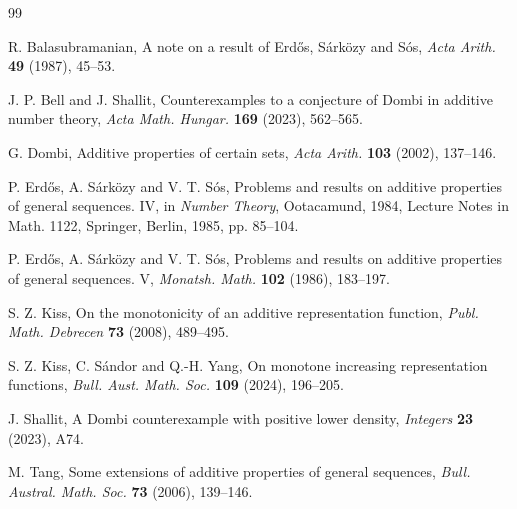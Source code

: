 \documentclass[11pt]{amsart}
\theoremstyle{remark}
\theoremstyle{plain}
\begin{document}
\begin{thebibliography}{99}


R. Balasubramanian, A note on a result of Erd\H{o}s, S\'{a}rk\"{o}zy and S\'{o}s, \emph{Acta Arith.} \textbf{49} (1987), 45--53.

J. P. Bell and J. Shallit, Counterexamples to a conjecture of Dombi in additive number theory, \emph{Acta Math. Hungar.} \textbf{169} (2023), 562--565.

G. Dombi, Additive properties of certain sets, \emph{Acta Arith.} \textbf{103} (2002), 137--146.


P. Erd\H{o}s, A. S\'{a}rk\"{o}zy and V. T. S\'{o}s, Problems and results on additive properties of general sequences. IV, in \emph{Number Theory}, Ootacamund, 1984, Lecture Notes in Math. 1122, Springer, Berlin, 1985, pp. 85--104.

P. Erd\H{o}s, A. S\'{a}rk\"{o}zy and V. T. S\'{o}s, Problems and results on additive properties of general sequences. V, \emph{Monatsh. Math.} \textbf{102} (1986), 183--197.

S. Z. Kiss, On the monotonicity of an additive representation function, \emph{Publ. Math. Debrecen} \textbf{73} (2008), 489--495.

S. Z. Kiss, C. S\'{a}ndor and Q.-H. Yang, On monotone increasing representation functions, \emph{Bull. Aust. Math. Soc.} \textbf{109} (2024), 196--205.

J. Shallit, A Dombi counterexample with positive lower density, \emph{Integers} \textbf{23} (2023), A74.

M. Tang, Some extensions of additive properties of general sequences, \emph{Bull. Austral. Math. Soc.} \textbf{73} (2006), 139--146.

\end{thebibliography}
\end{document}
